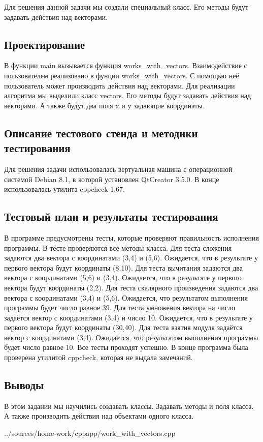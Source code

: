 \documentclass[12pt,a4paper]{report}
\begin{document}
Для решения данной задачи мы создали специальный класс. Его методы будут задавать действия над векторами.
\subsection{Проектирование}
В функции main вызывается функция works\_with\_vectors. Взаимодействие с пользователем реализовано в фунции works\_with\_vectors. С помощью неё пользователь может производить действия над векторами. Для реализации алгоритма мы выделили класс vectors. Его методы будут задавать действия над векторами. А также будут два поля x и y задающие координаты.
\subsection{Описание тестового стенда и методики тестирования}
Для решения задачи использовалась вертуальная машина с операционной системой Debian 8.1, в которой установлен QtCreator 3.5.0. В конце использовалась утилита cppcheck 1.67.
\subsection{Тестовый план и результаты тестирования}
В программе предусмотрены тесты, которые проверяют правильность исполнения программы. В тесте проверяются все методы класса. Для теста сложения задаются два вектора с координатами (3,4) и (5,6). Ожидается, что в результате у первого вектора будут координаты (8,10). Для теста вычитания задаются два вектора с координатами (5,6) и (3,4). Ожидается, что в результате у первого вектора будут координаты (2,2). Для теста скалярного произведения задаются два вектора с координатами (3,4) и (5,6). Ожидается, что результатом выполнения программы будет число равное 39. Для теста умножения вектора на число задаётся вектор с координатами (3,4) и число 10. Ожидается, что в результате у первого вектора будут координаты (30,40). Для теста взятия модуля задаётся вектор с координатами (3,4). Ожидается, что результатом выполнения программы будет число равное 10. Все тесты проходят успешно. В конце программа была проверена утилитой cppcheck, которая не выдала замечаний.
\subsection{Выводы}
В этом задании мы научились создавать классы. Задавать методы и поля класса. А также производить действия над объектами одного класса.

{../sources/home-work/cppapp/work_with_vectors.cpp}
\end{document}
